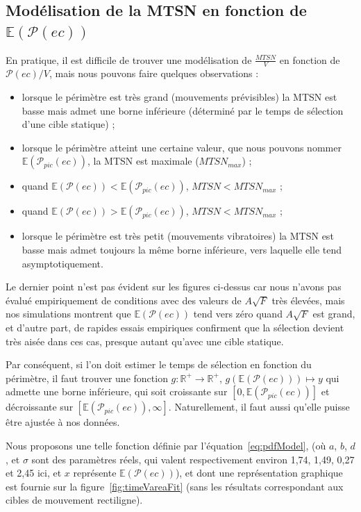 	\subsection{Modélisation de la MTSN en fonction \texorpdfstring{de $\mathbb{E}(\mathcal{P}(ec))$}{du périmètre}}
	En pratique, il est difficile de trouver une modélisation de $\frac{MTSN}{V}$ en fonction de $\mathcal{P}(ec)/V$, mais nous pouvons faire quelques observations :
	
	\begin{itemize}
		\item lorsque le périmètre est très grand (mouvements prévisibles) la MTSN est basse mais admet une borne inférieure (déterminé par le temps de sélection d'une cible statique) ;
		\item lorsque le périmètre atteint une certaine valeur, que nous pouvons nommer $\mathbb{E}(\mathcal{P}_{pic}(ec))$, la MTSN est maximale ($MTSN_{max}$) ;
		\item quand $\mathbb{E}(\mathcal{P}(ec)) < \mathbb{E}(\mathcal{P}_{pic}(ec))$, $MTSN < MTSN_{max}$ ;
		\item quand $\mathbb{E}(\mathcal{P}(ec)) > \mathbb{E}(\mathcal{P}_{pic}(ec))$, $MTSN < MTSN_{max}$ ;
		\item lorsque le périmètre est très petit (mouvements vibratoires) la MTSN est basse mais admet toujours la même borne inférieure, vers laquelle elle tend asymptotiquement.
	\end{itemize}
	
	Le dernier point n'est pas évident sur les figures ci-dessus car nous n'avons pas évalué empiriquement de conditions avec des valeurs de $A\sqrt{F}$ très élevées, mais nos simulations montrent que $\mathbb{E}(\mathcal{P}(ec))$ tend vers zéro quand $A\sqrt{F}$ est grand, et d'autre part, de rapides essais empiriques confirment que la sélection devient très aisée dans ces cas, presque autant qu'avec une cible statique.
	
	Par conséquent, si l'on doit estimer le temps de sélection en fonction du périmètre, il faut trouver une fonction $g : \mathbb{R}^{+} \to \mathbb{R}^{+}$, $g\left(\mathbb{E}(\mathcal{P}(ec))\right) \mapsto y$ qui admette une borne inférieure, qui soit croissante sur $[0, \mathbb{E}(\mathcal{P}_{pic}(ec))]$ et décroissante sur $[\mathbb{E}(\mathcal{P}_{pic}(ec)), \infty]$. Naturellement, il faut aussi qu'elle puisse être ajustée à nos données.
	
	Nous proposons une telle fonction définie par l'équation~\ref{eq:pdfModel}, (où $a$, $b$, $d$, et $\sigma$ sont des paramètres réels, qui valent respectivement environ 1,74, 1,49, 0,27 et 2,45 ici, et $x$ représente $\mathbb{E}(\mathcal{P}(ec))$), et dont une représentation graphique est fournie sur la figure~\ref{fig:timeVareaFit} (sans les résultats correspondant aux cibles de mouvement rectiligne).
	
